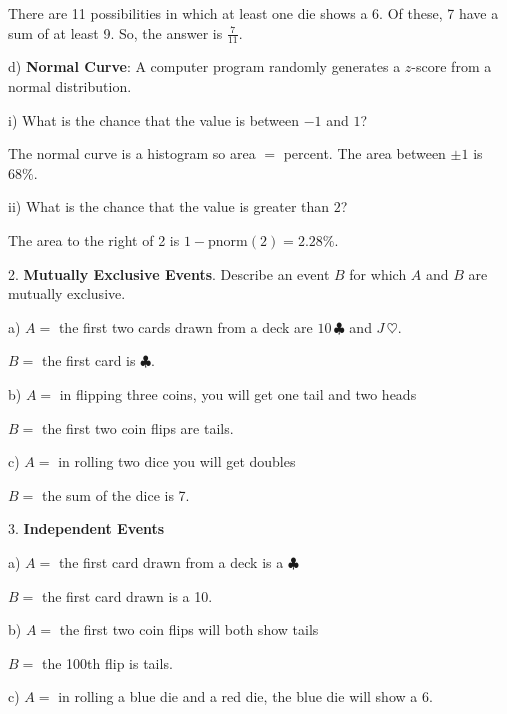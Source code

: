\documentclass[10pt]{article}
\begin{document}
{\color{blue} There are 11 possibilities in which at least one die shows a 6.  Of these, 7 have a sum 
of at least 9.  So, the answer is $\frac{7}{11}$.}
\bigskip


\hspace{10pt} d) \textbf{Normal Curve}:
  A computer program randomly generates a $z$-score from a normal distribution.

\hspace{20pt} i) What is the chance that the value is between $-1$ and $1$?

{\color{blue} The normal curve is a histogram so area $=$ percent.  The area between $\pm 1$ is $68\%$.}
\bigskip

\hspace{20pt} ii) What is the chance that the value is greater than $2$?

{\color{blue} The area to the right of 2 is $1-\mbox{pnorm}(2)=2.28\%$.}
\vfill
\eject

2. \textbf{Mutually Exclusive Events}.  Describe an event $B$ for which $A$ and $B$ are 
mutually exclusive.

\hspace{10pt} a) $A=$ the first two cards drawn from a deck are $10\,\clubsuit$ and $J\,\heartsuit$.

{\color{blue} $B=$ the first  card is $\clubsuit$}.
\smallskip

\hspace{10pt} b) $A=$ in flipping three coins, you will get one tail and two heads

{\color{blue} $B=$ the first  two coin flips are tails.}
\smallskip

\hspace{10pt} c) $A=$ in rolling two dice you will get doubles

{\color{blue} $B=$ the sum of the dice is 7.}
\smallskip

3. \textbf{Independent Events}

\hspace{10pt} a) $A=$ the first  card drawn from a deck is a $\clubsuit$

{\color{blue} $B=$ the first card drawn is a 10.}
\smallskip

\hspace{10pt} b) $A=$ the first two coin flips will both show tails

{\color{blue} $B=$ the 100th flip is tails.}
\smallskip

\hspace{10pt} c) $A=$ in rolling a blue die and a red die, the blue die will show a 6.
\end{document}
